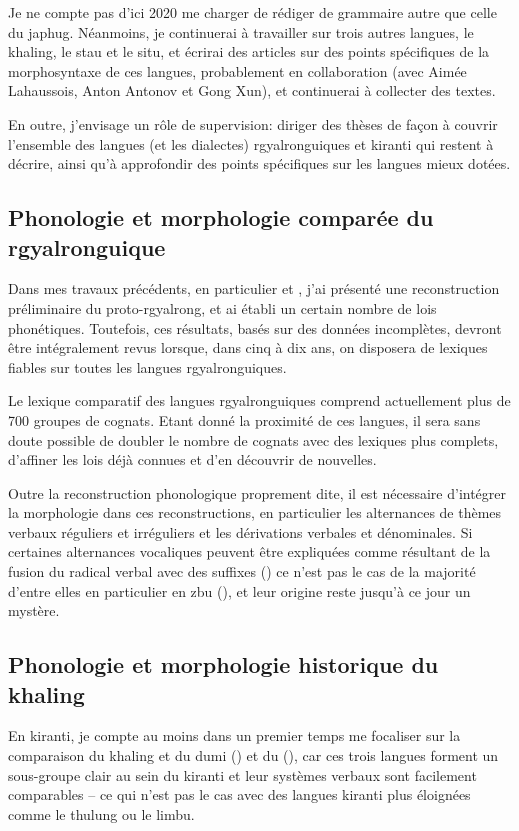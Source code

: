 \documentclass[oldfontcommands,oneside,a4paper,11pt]{article}
\begin{document}
Je ne compte pas d'ici 2020 me charger de rédiger de grammaire autre que celle du japhug. Néanmoins, je continuerai à travailler sur trois autres langues, le khaling, le stau et le situ, et écrirai des articles sur des points spécifiques de la morphosyntaxe de ces langues, probablement en collaboration (avec Aimée Lahaussois, Anton Antonov et Gong Xun), et continuerai à collecter des textes. 

En outre, j'envisage un rôle de supervision: diriger des thèses de façon à couvrir l'ensemble des langues (et les dialectes) rgyalronguiques et kiranti qui restent à décrire, ainsi qu'à approfondir des points spécifiques sur les langues mieux dotées.


\subsection{Phonologie et morphologie comparée du rgyalronguique} \label{sec:comparee.rgy}
Dans mes travaux précédents, en particulier \citet{jacques04these} et \citet{jacques14esquisse}, j'ai présenté une reconstruction préliminaire du proto-rgyalrong, et ai établi un certain nombre de lois phonétiques. Toutefois, ces résultats, basés sur des données incomplètes, devront être intégralement revus lorsque, dans cinq à dix ans, on disposera de lexiques fiables sur toutes les langues rgyalronguiques.

Le lexique comparatif des langues rgyalronguiques comprend actuellement plus de 700 groupes de cognats. Etant donné la proximité de ces langues, il sera sans doute possible de doubler le nombre de cognats avec des lexiques plus complets,  d'affiner les lois déjà connues et d'en découvrir de nouvelles. 

Outre la reconstruction phonologique proprement dite, il est nécessaire d'intégrer la morphologie dans ces reconstructions, en particulier les alternances de thèmes verbaux réguliers et irréguliers et les dérivations verbales et dénominales. Si certaines alternances vocaliques peuvent être expliquées comme résultant de la fusion du radical verbal avec des suffixes (\citealt[357-8]{jacques04these}) ce n'est pas le cas de la majorité d'entre elles en particulier en zbu (\citealt{jackson04showu}), et leur origine reste jusqu'à ce jour un mystère.

\subsection{Phonologie et morphologie historique du khaling}
En kiranti, je compte au moins dans un premier temps me focaliser sur la comparaison du khaling et du dumi (\citealt{driem93dumi}) et du (\citealt{lahaussois09}), car ces trois langues forment un sous-groupe clair au sein du kiranti et leur systèmes verbaux sont facilement comparables -- ce qui n'est pas le cas avec des langues kiranti plus éloignées comme le thulung ou le limbu.
\end{document}
